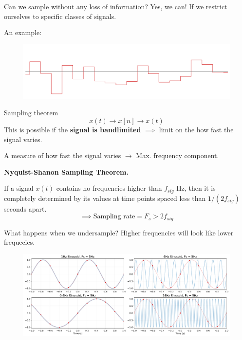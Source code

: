 \documentclass[aspectratio=169]{beamer}
\begin{document}
\begin{frame}[t]{Can we sample without any loss of information?}
Yes, we can! If we restrict ourselves to specific classes of signals.

An example:\\
\begin{figure}
\includegraphics[width=\textwidth, left]{img/pwconst.png}
\end{figure}
\end{frame}

\begin{frame}[t]{Sampling theorem}
\[ x(t) \longrightarrow x[n] \longrightarrow x(t) \]
This is possible if the \textbf{signal is bandlimited} $\implies$ limit on the how fast the signal varies.

\vspace{0.5cm}
A measure of how fast the signal varies $\longrightarrow$ Max. frequency component.

\vspace{0.5cm}
\textbf{Nyquist-Shanon Sampling Theorem.}

If a signal $x(t)$ contains no frequencies higher than $f_{sig}$ Hz, then it is completely determined by its values at time points spaced less than $1 / ( 2 f_{sig} )$ seconds apart.
\[ \implies \text{Sampling rate} = F_s > 2 f_{sig} \]
\end{frame}

\begin{frame}{What happens when we undersample?}
Higher frequencies will look like lower frequecies.
\begin{figure}
\includegraphics[width=\textwidth, center]{img/alias.png}
\end{figure}
\end{frame}
\end{document}
